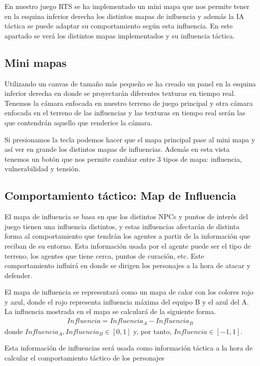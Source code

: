 En nuestro juego RTS se ha implementado un mini mapa que nos permite tener en la esquina inferior derecha los distintos mapas de influencia y además la IA táctica se puede adaptar su comportamiento según esta influencia. En este apartado se verá los distintos mapas implementados y su influencia táctica.

\subsection{Mini mapas}

Utilizando un canvas de tamaño más pequeño se ha creado un panel en la esquina inferior derecha en donde se proyectarán diferentes texturas en tiempo real. Tenemos la cámara enfocada en nuestro terreno de juego principal y otra cámara enfocada en el terreno de las influencias y las texturas en tiempo real serán las que contendrán aquello que renderice la cámara. 

Si presionamos la tecla  podemos hacer que el mapa principal pase al mini mapa y así ver en grande los distintos mapas de influencias.  Además en esta vista tenemos un botón que nos permite cambiar entre 3 tipos de mapa: influencia, vulnerabilidad y tensión.


\subsection{Comportamiento táctico: Map de Influencia}
El mapa de influencia se basa en que los distintos NPCs y puntos de interés del juego tienen una influencia distintos, y estas influencias afectarán de distinta forma al comportamiento que tendrán los agentes a partir de la información que reciban de su entorno. Esta información usada por el agente puede ser el tipo de terreno, los agentes que tiene cerca, puntos de curación, etc. Este comportamiento influirá en donde se dirigen los personajes a la hora de atacar y defender. 

El mapa de influencia se representará como un mapa de calor con los colores rojo y azul, donde el rojo representa influencia máxima del equipo B y el azul del A. La influencia mostrada en el mapa se calculará de la siguiente forma.
\begin{gather*}
    Influencia = Influencia_A - Influencia_B
\end{gather*}
donde $Influencia_A, Influencia_B \in [0,1]$ y, por tanto, $Influencia \in [-1, 1]$.


Esta información de influencias será usada como información táctica a la hora de calcular el comportamiento táctico de los personajes